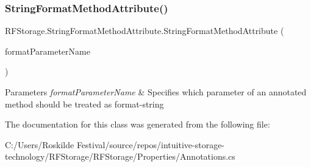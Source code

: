 \subsubsection{StringFormatMethodAttribute()}
{\footnotesize\ttfamily R\+F\+Storage.\+String\+Format\+Method\+Attribute.\+String\+Format\+Method\+Attribute (\begin{DoxyParamCaption}\item[{[\+Not\+Null] string}]{format\+Parameter\+Name }\end{DoxyParamCaption})}


\begin{DoxyParams}{Parameters}
{\em format\+Parameter\+Name} & Specifies which parameter of an annotated method should be treated as format-\/string \\
\hline
\end{DoxyParams}


The documentation for this class was generated from the following file\+:\begin{DoxyCompactItemize}
\item 
C\+:/\+Users/\+Roskilde Festival/source/repos/intuitive-\/storage-\/technology/\+R\+F\+Storage/\+R\+F\+Storage/\+Properties/Annotations.\+cs\end{DoxyCompactItemize}
